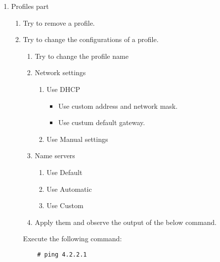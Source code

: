 \documentclass[a4paper,10pt]{article}
\begin{document}
\begin{enumerate}
\item Profiles part
    \begin{enumerate}
    \item Try to remove a profile.
    \item Try to change the configurations of a profile.
        \begin{enumerate}
        \item Try to change the profile name
        \item Network settings
            \begin{enumerate}
            \item Use DHCP
                \begin{itemize}
                \item Use custom address and network mask.
                \item Use custum default gateway.
                \end{itemize}
            \item Use Manual settings
            \end{enumerate}

        \item Name servers
            \begin{enumerate}
            \item Use Default
            \item Use Automatic
            \item Use Custom
            \end{enumerate}
        \item Apply them and observe the output of the below command.
        \end{enumerate}

        Execute the following command:
\begin{verbatim}
    # ping 4.2.2.1
\end{verbatim} 
    \end{enumerate}
\end{enumerate}
\end{document}
